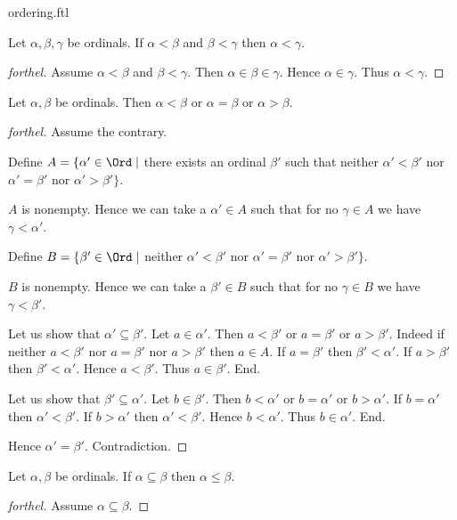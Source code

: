 \documentclass{naproche-library}
\begin{document}
\begin{smodule}[title=The Standard Ordering of the Ordinals]{ordering.ftl}
\begin{proposition}[forthel,id=SET_THEORY_02_7098683017396224]
  Let $\alpha, \beta, \gamma$ be ordinals.
  If $\alpha < \beta$ and $\beta < \gamma$ then $\alpha < \gamma$.
\end{proposition}
\begin{proof}[forthel]
  Assume $\alpha < \beta$ and $\beta < \gamma$.
  Then $\alpha \in \beta \in \gamma$.
  Hence $\alpha \in \gamma$.
  Thus $\alpha < \gamma$.
\end{proof}

\begin{proposition}[forthel,id=SET_THEORY_02_1718825707896832]
  Let $\alpha, \beta$ be ordinals.
  Then $\alpha < \beta$ or $\alpha = \beta$ or $\alpha > \beta$.
\end{proposition}
\begin{proof}[forthel]
  Assume the contrary.
  
  Define $A = \{ \alpha' \in \Ord \mid$ there exists an ordinal $\beta'$ such that neither $\alpha' < \beta'$ nor $\alpha' = \beta'$ nor $\alpha' > \beta' \}$.
  
  $A$ is nonempty.
  Hence we can take a $\alpha' \in A$ such that for no $\gamma \in A$ we have $\gamma < \alpha'$.
  
  Define $B = \{ \beta' \in \Ord \mid$ neither $\alpha' < \beta'$ nor $\alpha' = \beta'$ nor $\alpha' > \beta' \}$.
  
  $B$ is nonempty.
  Hence we can take a $\beta' \in B$ such that for no $\gamma \in B$ we have $\gamma < \beta'$.

  Let us show that $\alpha' \subseteq \beta'$.
    Let $a \in \alpha'$.
    Then $a < \beta'$ or $a = \beta'$ or $a > \beta'$.
    Indeed if neither $a < \beta'$ nor $a = \beta'$ nor $a > \beta'$ then
    $a \in A$.
    If $a = \beta'$ then $\beta' < \alpha'$.
    If $a > \beta'$ then $\beta' < \alpha'$.
    Hence $a < \beta'$.
    Thus $a \in \beta'$.
  End.

  Let us show that $\beta' \subseteq \alpha'$.
    Let $b \in \beta'$.
    Then $b < \alpha'$ or $b = \alpha'$ or $b > \alpha'$.
    If $b = \alpha'$ then $\alpha' < \beta'$.
    If $b > \alpha'$ then $\alpha' < \beta'$.
    Hence $b < \alpha'$.
    Thus $b \in \alpha'$.
  End.

  Hence $\alpha' = \beta'$.
  Contradiction.
\end{proof}

\begin{proposition}[forthel,id=SET_THEORY_02_610496856195072]
  Let $\alpha, \beta$ be ordinals.
  If $\alpha \subseteq \beta$ then $\alpha \leq \beta$.
\end{proposition}
\begin{proof}[forthel]
  Assume $\alpha \subseteq \beta$.


\end{proof}
\end{smodule}
\end{document}
